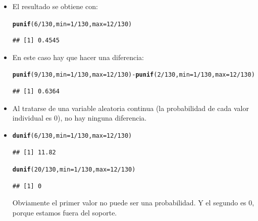\documentclass[10pt,a4paper]{article}\usepackage[]{graphicx}\usepackage[]{color}
\makeatletter
\newcommand{\hlnum}[1]{\textcolor[rgb]{0.686,0.059,0.569}{#1}}%
\newcommand{\hlopt}[1]{\textcolor[rgb]{0,0,0}{#1}}%
\newcommand{\hlstd}[1]{\textcolor[rgb]{0.345,0.345,0.345}{#1}}%
\newcommand{\hlkwc}[1]{\textcolor[rgb]{0.333,0.667,0.333}{#1}}%
\newcommand{\hlkwd}[1]{\textcolor[rgb]{0.737,0.353,0.396}{\textbf{#1}}}%
\newenvironment{kframe}{%
 \def\at@end@of@kframe{}%
 \ifinner\ifhmode%
  \def\at@end@of@kframe{\end{minipage}}%
  \begin{minipage}{\columnwidth}%
 \fi\fi%
 \def\FrameCommand##1{\hskip\@totalleftmargin \hskip-\fboxsep
 \colorbox{shadecolor}{##1}\hskip-\fboxsep
     \hskip-\linewidth \hskip-\@totalleftmargin \hskip\columnwidth}%
 \MakeFramed {\advance\hsize-\width
   \@totalleftmargin\z@ \linewidth\hsize
   \@setminipage}}%
 {\par\unskip\endMakeFramed%
 \at@end@of@kframe}
\newenvironment{knitrout}{}{} %
\newcounter{cont01}
\makeatother
\begin{document}
\begin{itemize}
  \item El resultado se obtiene con:
\begin{knitrout}
\color{fgcolor}\begin{kframe}
\begin{alltt}
\hlkwd{punif}\hlstd{(}\hlnum{6}\hlopt{/}\hlnum{130}\hlstd{,} \hlkwc{min}\hlstd{=}\hlnum{1}\hlopt{/}\hlnum{130}\hlstd{,} \hlkwc{max}\hlstd{=}\hlnum{12}\hlopt{/}\hlnum{130}\hlstd{)}
\end{alltt}
\begin{verbatim}
## [1] 0.4545
\end{verbatim}
\end{kframe}
\end{knitrout}
  \item En este caso hay que hacer una diferencia:
\begin{knitrout}
\color{fgcolor}\begin{kframe}
\begin{alltt}
\hlkwd{punif}\hlstd{(}\hlnum{9}\hlopt{/}\hlnum{130}\hlstd{,} \hlkwc{min}\hlstd{=}\hlnum{1}\hlopt{/}\hlnum{130}\hlstd{,} \hlkwc{max}\hlstd{=}\hlnum{12}\hlopt{/}\hlnum{130}\hlstd{)} \hlopt{-} \hlkwd{punif}\hlstd{(}\hlnum{2}\hlopt{/}\hlnum{130}\hlstd{,} \hlkwc{min}\hlstd{=}\hlnum{1}\hlopt{/}\hlnum{130}\hlstd{,} \hlkwc{max}\hlstd{=}\hlnum{12}\hlopt{/}\hlnum{130}\hlstd{)}
\end{alltt}
\begin{verbatim}
## [1] 0.6364
\end{verbatim}
\end{kframe}
\end{knitrout}

  \item Al tratarse de una variable aleatoria continua (la probabilidad de cada valor individual es $0$), no hay ninguna diferencia.

  \item
\begin{knitrout}
\color{fgcolor}\begin{kframe}
\begin{alltt}
\hlkwd{dunif}\hlstd{(}\hlnum{6}\hlopt{/}\hlnum{130}\hlstd{,} \hlkwc{min}\hlstd{=}\hlnum{1}\hlopt{/}\hlnum{130}\hlstd{,} \hlkwc{max}\hlstd{=}\hlnum{12}\hlopt{/}\hlnum{130}\hlstd{)}
\end{alltt}
\begin{verbatim}
## [1] 11.82
\end{verbatim}
\begin{alltt}
\hlkwd{dunif}\hlstd{(}\hlnum{20}\hlopt{/}\hlnum{130}\hlstd{,} \hlkwc{min}\hlstd{=}\hlnum{1}\hlopt{/}\hlnum{130}\hlstd{,} \hlkwc{max}\hlstd{=}\hlnum{12}\hlopt{/}\hlnum{130}\hlstd{)}
\end{alltt}
\begin{verbatim}
## [1] 0
\end{verbatim}
\end{kframe}
\end{knitrout}
  Obviamente el primer valor no puede ser una probabilidad. Y el segundo es $0$, porque estamos fuera del soporte.


\end{itemize}
\end{document}
